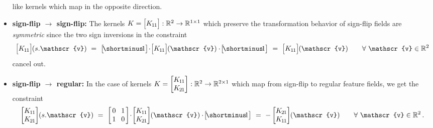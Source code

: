 \begin{itemize}
        like kernels which map in the opposite direction.
    \item[{\rule[2.0pt]{2pt}{2pt}}]
    \textbf{sign-flip $\bm\to$ sign-flip:}
        The kernels
        $K = \pig[\Koo\pig]: \R^2 \to \R^{1\times1}$
        which preserve the transformation behavior of sign-flip fields are \emph{symmetric} since the two sign inversions in the constraint
        \begin{align}
                \pig[\Koo\pig] \mkern-1mu (s.\mathscr{v})
            \ =\ 
                \big[\! \shortminus\!1 \big]
                \!\cdot\!
                \pig[\Koo\pig] \mkern-1mu (\mathscr{v})
                \cdot\!
                \big[\! \shortminus\!1 \big]
            \ =\ 
                \pig[\Koo\pig] \mkern-1mu (\mathscr{v})
            \qquad \forall\ \mathscr{v} \in \R^2
        \end{align}
        cancel out.
    \item[{\rule[2.0pt]{2pt}{2pt}}]
    \textbf{sign-flip $\bm\to$ regular:}
        In the case of kernels
        $K = \begin{bmatrix} K_{\mkern-1mu 1 \mkern-1mu 1} \\ K_{\mkern-1mu 2 \mkern-1mu 1} \end{bmatrix}: \mathbb{R}^2 \to \mathbb{R}^{2\times1}$
        which map from sign-flip to regular feature fields, we get the constraint
        \begin{align}
                \begin{bmatrix} \Koo \\ \Kto \end{bmatrix} \mkern-4mu (s.\mathscr{v})
            \ =\ 
                \begin{bmatrix} \hspace{1.5pt} 0 &\mkern-4mu 1 \hspace*{1.5pt} \\ \hspace{1.5pt} 1 &\mkern-4mu 0 \hspace*{1.5pt} \end{bmatrix}
                \!\cdot\!
                \begin{bmatrix} \Koo \\ \Kto \end{bmatrix} \mkern-4mu (\mathscr{v})
                \cdot\!
                \big[\! \shortminus\!1 \big]
            \ =\ 
                - \begin{bmatrix} \Kto \\ \Koo \end{bmatrix} \mkern-4mu (\mathscr{v})
            \qquad \forall\ \mathscr{v} \in \R^2 \,.

\end{align}
\end{itemize}
